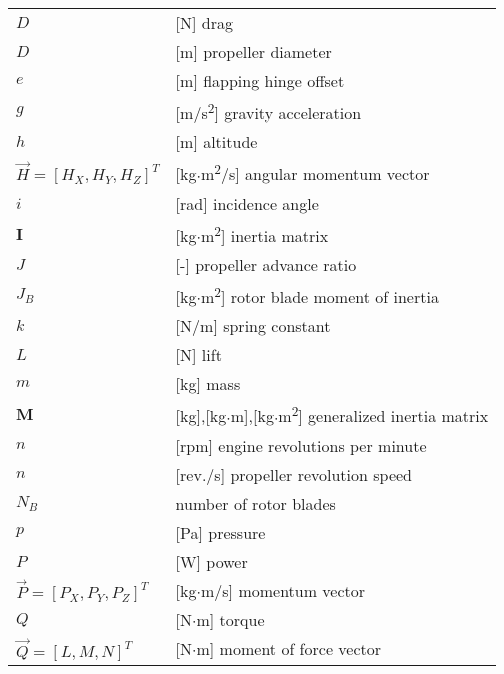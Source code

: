 \begin{longtable}[l]{ l p{} }
  $D$                                          & [N] drag \\
  $D$                                          & [m] propeller diameter \\
  $e$                                          & [m] flapping hinge offset \\
  $g$                                          & [m/s\textsuperscript{2}] gravity acceleration \\
  $h$                                          & [m] altitude \\
  $\vec H=\left[ H_X, H_Y, H_Z \right]^T$      & [kg$\cdot$m\textsuperscript{2}/s] angular momentum vector \\
  $i$                                          & [rad] incidence angle \\
  $\boldsymbol I$                              & [kg$\cdot$m\textsuperscript{2}] inertia matrix \\
  $J$                                          & [-] propeller advance ratio \\
  $J_B$                                        & [kg$\cdot$m\textsuperscript{2}] rotor blade moment of inertia \\
  $k$                                          & [N/m] spring constant \\
  $L$                                          & [N] lift \\
  $m$                                          & [kg] mass \\
  $\boldsymbol M$                              & [kg],[kg$\cdot$m],[kg$\cdot$m\textsuperscript{2}] generalized inertia matrix \\
  $n$                                          & [rpm] engine revolutions per minute \\
  $n$                                          & [rev./s] propeller revolution speed \\
  $N_B$                                        & number of rotor blades \\
  $p$                                          & [Pa] pressure \\
  $P$                                          & [W] power \\
  $\vec P=\left[ P_X, P_Y, P_Z \right]^T$      & [kg$\cdot$m/s] momentum vector \\
  $Q$                                          & [N$\cdot$m] torque \\
  $\vec Q=\left[ L, M, N \right]^T$            & [N$\cdot$m] moment of force vector \\

\end{longtable}
